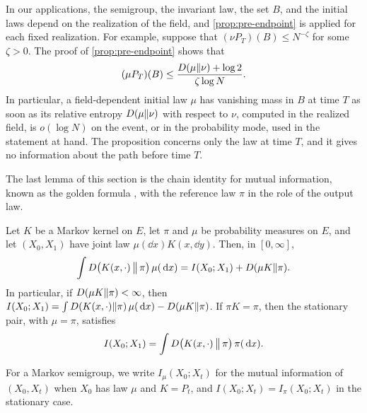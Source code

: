\begin{remark}\label{rem:pre-endpoint}
In our applications, the semigroup, the invariant law, the set $B$, and the initial laws depend on the realization of the field, and \cref{prop:pre-endpoint} is applied for each fixed realization. For example, suppose that $(\nu P_T)(B)\le N^{-\zeta}$ for some $\zeta>0$. The proof of \cref{prop:pre-endpoint} shows that
\[
(\mu P_T)(B)\le\frac{D(\mu\|\nu)+\log2}{\zeta\log N}.
\]
In particular, a field-dependent initial law $\mu$ has vanishing mass in $B$ at time $T$ as soon as its relative entropy $D(\mu\|\nu)$ with respect to $\nu$, computed in the realized field, is $o(\log N)$ on the event, or in the probability mode, used in the statement at hand. The proposition concerns only the law at time $T$, and it gives no information about the path before time $T$.
\end{remark}

The last lemma of this section is the chain identity for mutual information, known as the golden formula \cite[Theorem~4.1]{PolyanskiyWu2025}, with the reference law $\pi$ in the role of the output law.

\begin{lemma}\label{lem:pre-MI}
Let $K$ be a Markov kernel on $E$, let $\pi$ and $\mu$ be probability measures on $E$, and let $(X_0,X_1)$ have joint law $\mu(\dd x)K(x,\dd y)$. Then, in $[0,\infty]$,
\begin{equation}\label{eq:pre-golden}
\int D\big(K(x,\cdot)\,\big\|\,\pi\big)\,\mu(\,\mathrm d x)=I(X_0;X_1)+D(\mu K\|\pi).
\end{equation}
In particular, if $D(\mu K\|\pi)<\infty$, then $I(X_0;X_1)=\int D(K(x,\cdot)\|\pi)\,\mu(\,\mathrm d x)-D(\mu K\|\pi)$. If $\pi K=\pi$, then the stationary pair, with $\mu=\pi$, satisfies
\begin{equation}\label{eq:pre-golden-stationary}
I(X_0;X_1)=\int D\big(K(x,\cdot)\,\big\|\,\pi\big)\,\pi(\,\mathrm d x).
\end{equation}
\end{lemma}

For a Markov semigroup, we write $I_\mu(X_0;X_t)$ for the mutual information of $(X_0,X_t)$ when $X_0$ has law $\mu$ and $K=P_t$, and $I(X_0;X_t)=I_\pi(X_0;X_t)$ in the stationary case.


